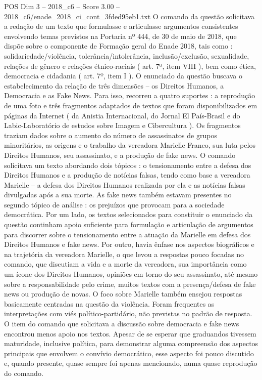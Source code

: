 \begin{textsample}{POS Dim 3 – 2018\_c6 – Score 3.00 – 2018\_c6/enade\_2018\_ci\_cont\_3fded95eb1.txt}
O comando da questão solicitava a redação de um texto que formulasse e articulasse argumentos consistentes envolvendo temas previstos na Portaria nº 444, de 30 de maio de 2018, que dispõe sobre o componente de Formação geral do Enade 2018, tais como : solidariedade/violência, tolerância/intolerância, inclusão/exclusão, sexualidade, relações de gênero e relações étnico-raciais ( art. 7º, item VIII ), bem como ética, democracia e cidadania ( art. 7º, item I ).
O enunciado da questão buscava o estabelecimento da relação de três dimensões – os Direitos Humanos, a Democracia e as Fake News.
Para isso, recorreu a quatro suportes : a reprodução de uma foto e três fragmentos adaptados de textos que foram disponibilizados em páginas da Internet ( da Anistia Internacional, do Jornal El País-Brasil e do Labic-Laboratório de estudos sobre Imagem e Cibercultura ).
Os fragmentos traziam dados sobre o aumento do número de assassinatos de grupos minoritários, as origens e o trabalho da vereadora Marielle Franco, sua luta pelos Direitos Humanos, seu assassinato, e a produção de fake news.
O comando solicitava um texto abordando dois tópicos : o tensionamento entre a defesa dos Direitos Humanos e a produção de notícias falsas, tendo como base a vereadora Marielle – a defesa dos Direitos Humanos realizada por ela e as notícias falsas divulgadas após a sua morte.
As fake news também estavam presentes no segundo tópico de análise : os prejuízos que provocam para a sociedade democrática.
Por um lado, os textos selecionados para constituir o enunciado da questão continham apoio suficiente para formulação e articulação de argumentos para discorrer sobre o tensionamento entre a atuação da Marielle em defesa dos Direitos Humanos e fake news.
Por outro, havia ênfase nos aspectos biográficos e na trajetória da vereadora Marielle, o que levou a respostas pouco focadas no comando, que discutiam a vida e a morte da vereadora, sua importância como um ícone dos Direitos Humanos, opiniões em torno do seu assassinato, até mesmo sobre a responsabilidade pelo crime, muitos textos com a presença/defesa de fake news ou produção de novas.
O foco sobre Marielle também ensejou respostas basicamente centradas na questão da violência.
Foram frequentes as interpretações com viés político-partidário, não previstas no padrão de resposta.
O item do comando que solicitava a discussão sobre democracia e fake news encontrou menos apoio nos textos.
Apesar de se esperar que graduandos tivessem maturidade, inclusive política, para demonstrar alguma compreensão dos aspectos principais que envolvem o convívio democrático, esse aspecto foi pouco discutido e, quando presente, quase sempre foi apenas mencionado, numa quase reprodução do comando.

\end{textsample}
